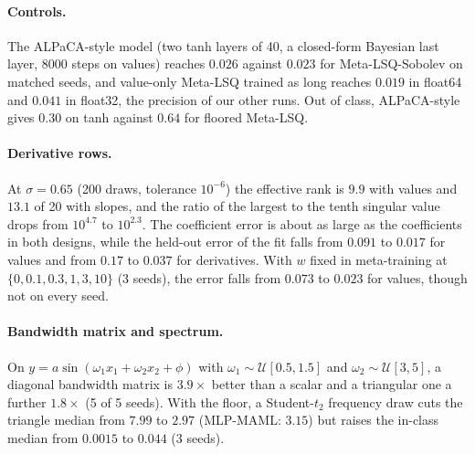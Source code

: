 \documentclass[fullpaper,final]{nldl}
\theoremstyle{plain}
\theoremstyle{definition}
\begin{document}
\paragraph{Controls.} The ALPaCA-style model (two tanh layers of 40, a closed-form
Bayesian last layer, 8000 steps on values) reaches $0.026$ against $0.023$ for
Meta-LSQ-Sobolev on matched seeds, and value-only Meta-LSQ trained as long reaches
$0.019$ in float64 and $0.041$ in float32, the precision of our other runs. Out of class, ALPaCA-style gives $0.30$ on tanh against $0.64$
for floored Meta-LSQ.

\paragraph{Derivative rows.} At $\sigma{=}0.65$ (200 draws, tolerance $10^{-6}$) the
effective rank is $9.9$ with values and $13.1$ of 20 with slopes, and the ratio of
the largest to the tenth singular value drops from $10^{4.7}$ to $10^{2.3}$. The
coefficient error is about as large as the coefficients in both designs, while the
held-out error of the fit falls from $0.091$ to $0.017$ for values and from $0.17$
to $0.037$ for derivatives. With $w$ fixed in meta-training at
$\{0,0.1,0.3,1,3,10\}$ (3 seeds), the error falls from $0.073$ to $0.023$ for values,
though not on every seed.

\paragraph{Bandwidth matrix and spectrum.} On $y = a\sin(\omega_1x_1+\omega_2x_2+\phi)$
with $\omega_1 \sim \mathcal{U}[0.5,1.5]$ and $\omega_2 \sim \mathcal{U}[3,5]$, a
diagonal bandwidth matrix is $3.9\times$ better than a scalar and a triangular one a
further $1.8\times$ (5 of 5 seeds). With the floor, a Student-$t_2$ frequency draw
cuts the triangle median from $7.99$ to $2.97$ (MLP-MAML: $3.15$) but raises the
in-class median from $0.0015$ to $0.044$ (3 seeds).
\end{document}
